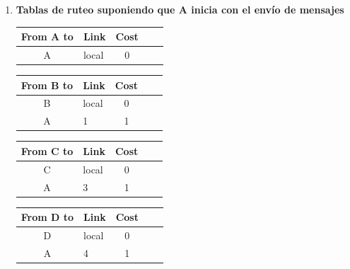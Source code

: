 \begin{enumerate}
\begin{enumerate}
        \item[] \textbf{Tablas de ruteo suponiendo que A inicia con el env\'io de mensajes}
        \begin{table}[H]
            \begin{tabular}{@{}clcll@{}}
                \toprule
                From A to            & \multicolumn{1}{c}{Link} & Cost                 \\ \midrule
                A                    & local                    & 0                    \\ \bottomrule
            \end{tabular}
            \hfill
            \begin{tabular}{@{}clcll@{}}
                \toprule
                From B to            & \multicolumn{1}{c}{Link} & Cost                 \\ \midrule
                B                    & local                    & 0                    \\ 
                A                    & 1                        & 1                    \\ \bottomrule
            \end{tabular}
            \hfill
            \begin{tabular}{@{}clcll@{}}
                \toprule
                From C to            & \multicolumn{1}{c}{Link} & Cost                 \\ \midrule
                C                    & local                    & 0                    \\ 
                A                    & 3                        & 1                    \\ \bottomrule
            \end{tabular}
        \end{table}
        \begin{table}[H]
            \begin{tabular}{@{}clcll@{}}
                \toprule
                From D to            & \multicolumn{1}{c}{Link} & Cost                 \\ \midrule
                D                    & local                    & 0                    \\ 
                A                    & 4                        & 1                    \\ \bottomrule
            \end{tabular}
            \hfill
            \begin{tabular}{@{}clcll@{}}

\end{tabular}
\end{table}
\end{enumerate}
\end{enumerate}
